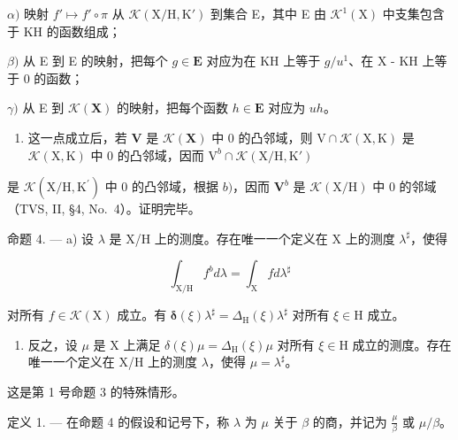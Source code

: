 \(\alpha)\) 映射 \(f' \mapsto f' \circ \pi\) 从 \(\mathcal{K}(\mathrm{X}/\mathrm{H}, \mathrm{K}')\) 到集合 E，其中 E 由 \(\mathcal{K}^1(\mathrm{X})\) 中支集包含于 KH 的函数组成；

\(\beta)\) 从 E 到 E 的映射，把每个 \(g \in \mathbf{E}\) 对应为在 KH 上等于 \(g / u^1\)、在 X - KH 上等于 0 的函数；

\(\gamma)\) 从 E 到 \(\mathcal{K}(\mathbf{X})\) 的映射，把每个函数 \(h \in \mathbf{E}\) 对应为 \(uh\)。

\begin{enumerate}
\def\labelenumi{\alph{enumi})}
\setcounter{enumi}{2}
\tightlist
\item
  这一点成立后，若 \(\mathbf{V}\) 是 \(\mathcal{K}(\mathbf{X})\) 中 0 的凸邻域，则 \(\mathrm{V} \cap \mathcal{K}(\mathrm{X}, \mathrm{K})\) 是 \(\mathcal{K}(\mathrm{X}, \mathrm{K})\) 中 0 的凸邻域，因而 \(\mathrm{V}^{b} \cap \mathcal{K}(\mathrm{X} / \mathrm{H}, \mathrm{K}')\)
\end{enumerate}

是 \(\mathcal{K}(\mathrm{X / H},\mathrm{K}^{\prime})\) 中 0 的凸邻域，根据 \(b)\)，因而 \(\mathbf{V}^b\) 是 \(\mathcal{K}(\mathrm{X / H})\) 中 0 的邻域（TVS, II, §4, No.~4）。证明完毕。

命题 4. --- a) 设 \(\lambda\) 是 X/H 上的测度。存在唯一一个定义在 X 上的测度 \(\lambda^{\sharp}\)，使得

\[
\int_ {\mathrm{X} / \mathrm{H}} f ^ {b} d \lambda = \int_ {\mathrm{X}} f d \lambda^ {\sharp}\tag{6}
\]

对所有 \(f \in \mathcal{K}(\mathrm{X})\) 成立。有 \(\pmb{\delta}(\xi)\lambda^{\sharp} = \Delta_{\mathrm{H}}(\xi)\lambda^{\sharp}\) 对所有 \(\xi \in \mathrm{H}\) 成立。

\begin{enumerate}
\def\labelenumi{\alph{enumi})}
\setcounter{enumi}{1}
\tightlist
\item
  反之，设 \(\mu\) 是 X 上满足 \(\delta(\xi)\mu = \Delta_{\mathrm{H}}(\xi)\mu\) 对所有 \(\xi \in \mathrm{H}\) 成立的测度。存在唯一一个定义在 X/H 上的测度 \(\lambda\)，使得 \(\mu = \lambda^{\sharp}\)。
\end{enumerate}

这是第 1 号命题 3 的特殊情形。

定义 1. --- 在命题 4 的假设和记号下，称 \(\lambda\) 为 \(\mu\) 关于 \(\beta\) 的商，并记为 \(\frac{\mu}{\beta}\) 或 \(\mu/\beta\)。

